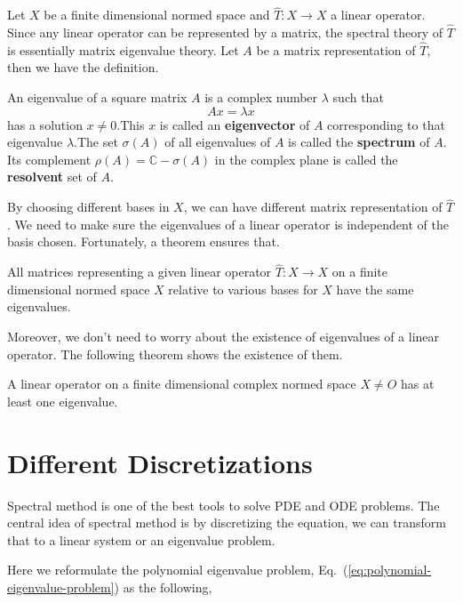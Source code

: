 Let $X$ be a finite dimensional normed space and $\hat{T}: X \to X$ a linear operator. Since any linear operator can be represented by a matrix, the spectral theory of $\hat{T}$ is essentially matrix eigenvalue theory. \cite{kreyszig_introductory_1978} Let $A$ be a matrix representation of $\hat{T}$, then we have the definition.

\begin{definition} 
	An eigenvalue of a square matrix $A$ is a complex number $\lambda$ such that
	\[ Ax = \lambda x \]
	has a solution $x\neq 0$.This $x$ is called an \textbf{eigenvector} of $A$ corresponding to that eigenvalue $\lambda$.The set $\sigma(A)$ of all eigenvalues of $A$ is called the \textbf{spectrum} of $A$. Its complement $\rho(A) = \mathbb{C}-\sigma(A)$ in the complex plane is called the \textbf{resolvent} set of $A$.
\end{definition}

By choosing different bases in $X$, we can have different matrix representation of $\hat{T}$. We need to make sure the eigenvalues of a linear operator is independent of the basis chosen. Fortunately, a theorem ensures that.

\begin{theorem} 
	All matrices representing a given linear operator $\hat{T}: X \to X$ on a finite dimensional normed space $X$ relative to various bases for $X$ have the same eigenvalues.
\end{theorem}


Moreover, we don't need to worry about the existence of eigenvalues of a linear operator. The following theorem shows the existence of them.
\begin{theorem} 
	A linear operator on a finite dimensional complex normed space $X\neq{O}$ has at least one eigenvalue.
\end{theorem}


\section{Different Discretizations}
Spectral method is one of the best tools to solve PDE and ODE problems. \cite{trefethen_spectral_2000} The central idea of spectral method is by discretizing the equation, we can transform that to a linear system or an eigenvalue problem.

Here we reformulate the polynomial eigenvalue problem, Eq.~(\ref{eq:polynomial-eigenvalue-problem}) as the following,

